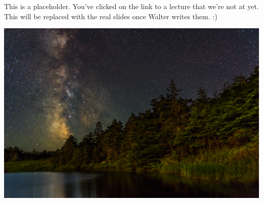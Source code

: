 \documentclass[14ampt]{article}
\begin{document}
	\Huge


This is a placeholder. You've clicked on the link to a lecture that we're not at yet. This will be replaced with the real slides once Walter writes them. :)

\begin{center}
	\includegraphics[width=\textwidth]{darkened-milky-way.jpg}
\end{center}
\end{document}
